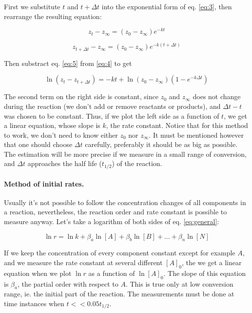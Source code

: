 First we substitute $t$ and $t + \Delta t$ into the exponential form of eq. \ref{eq:3}, then rearrange the resulting equation:

\begin{equation}
\label{eq:4}
	z_t - z_{\infty}
	=
	(z_0 - z_{\infty}) e^{-kt}
\end{equation}

\begin{equation}
\label{eq:5}
	z_{t + \Delta t} - z_{\infty} = (z_0 - z_{\infty}) e^{-k(t+\Delta t)}
\end{equation}

Then substract eq. \ref{eq:5} from \ref{eq:4} to get

\begin{equation}
\label{eq:6}
        \ln (z_t - z_{t+\Delta t})
	=
	-kt
	+ \ln (z_0 - z_{\infty}) (1- e^{-k \Delta t})
\end{equation}

The second term on the right side is constant, since $z_0$ and $z_\infty$ does not change during the reaction (we don't add or remove reactants or products), and $\Delta t - t$ was chosen to be constant.
Thus, if we plot the left side as a function of $t$, we get a linear equation, whose slope is $k$, the rate constant.
Notice that for this method to work, we don't need to know either $z_0$ nor $z_\infty$. 
It must be mentioned however that one should choose $\Delta t$ carefully, preferably it should be as big as possible.
The estimation will be more precise if we measure in a small range of conversion, and $\Delta t$ approaches the half life ($t_{1/2}$) of the reaction.

\paragraph{Method of initial rates.}
Usually it's not possible to follow the concentration changes of all components in a reaction, nevertheless, the reaction order and rate constant is possible to measure anyway. Let's take a logarithm of both sides of eq. \ref{eq:general}: 

\begin{equation}
\label{eq:log}
	\ln r
	=
	\ln k
	+ \beta _a \ln [A]
	+ \beta _b \ln [B]
	+ ...
	+ \beta _n \ln [N]
\end{equation}

If we keep the concentration of every component constant except for example $A$, and we measure the rate constant at several different $[A]_0$, the we get a linear equation when we plot $\ln r$ as a function of $\ln [A]_0$. The slope of this equation is $\beta _a$, the partial order with respect to $A$.
This is true only at low conversion range, ie. the initial part of the reaction. The measurements must be done at time instances when $t << 0.05 t_{1/2}$.

